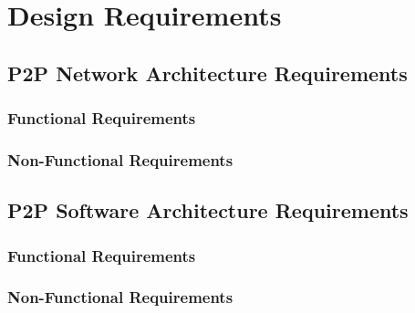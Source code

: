 \section{Design Requirements}


\subsection{P2P Network Architecture Requirements}

\subsubsection{Functional Requirements}


\subsubsection{Non-Functional Requirements}


\subsection{P2P Software Architecture Requirements}


\subsubsection{Functional Requirements}


\subsubsection{Non-Functional Requirements}
